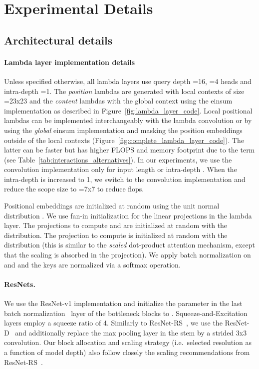 \documentclass{article} \usepackage{iclr2021_conference,times}
\begin{document}
\section{Experimental Details\label{sec:experimental_details}}

\subsection{Architectural details\label{sec:architecture_details}}

\vspace{-0.1cm}
\paragraph{Lambda layer implementation details\label{sec:implementation_details}}
Unless specified otherwise, all lambda layers use query depth =16, =4 heads and intra-depth =1.
The \emph{position} lambdas are generated with local contexts of size =23x23 and the \emph{content} lambdas with the global context using the einsum implementation as described in Figure~\ref{fig:lambda_layer_code}.
Local positional lambdas can be implemented interchangeably with the lambda convolution or by using the \emph{global} einsum implementation and masking the position embeddings outside of the local contexts (Figure~\ref{fig:complete_lambda_layer_code}).
The latter can be faster but has higher FLOPS and memory footprint due to the  term (see Table~\ref{tab:interactions_alternatives}).
In our experiments, we use the convolution implementation only for input length  or intra-depth .
When the intra-depth is increased to 1, we switch to the convolution implementation and reduce the scope size to =7x7 to reduce flops.

Positional embeddings are initialized at random using the unit normal distribution .
We use fan-in initialization for the linear projections in the lambda layer.
The projections to compute  and  are initialized at random with the  distribution.
The projection to compute  is initialized at random with the  distribution (this is similar to the \emph{scaled} dot-product attention mechanism, except that the scaling is absorbed in the projection).
We apply batch normalization on  and  and the keys  are normalized via a softmax operation.

\vspace{-0.1cm}
\paragraph{ResNets.}
We use the ResNet-v1 implementation and initialize the  parameter in the last batch normalization~\citep{BatchNorm} layer of the bottleneck blocks to .
Squeeze-and-Excitation layers employ a squeeze ratio of 4.
Similarly to ResNet-RS~\citep{bello2021revisiting}, we use the ResNet-D~\citep{he2018bag} and additionally replace the max pooling layer in the stem by a strided 3x3 convolution.
Our block allocation and scaling strategy (i.e.\ selected resolution as a function of model depth) also follow closely the scaling recommendations from ResNet-RS~\citep{bello2021revisiting}.
\end{document}
